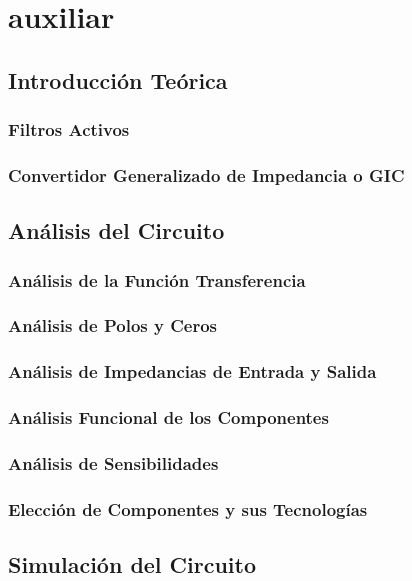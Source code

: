 \documentclass[a4paper]{article}
\begin{document}
\tableofcontents

\section{auxiliar}

\subsection{Introducción Teórica}
\subsubsection{Filtros Activos}
\subsubsection{Convertidor Generalizado de Impedancia o GIC}

\subsection{Análisis del Circuito}
\subsubsection{Análisis de la Función Transferencia}
\subsubsection{Análisis de Polos y Ceros}
\subsubsection{Análisis de Impedancias de Entrada y Salida}
\subsubsection{Análisis Funcional de los Componentes}
\subsubsection{Análisis de Sensibilidades}
\subsubsection{Elección de Componentes y sus Tecnologías}

\subsection{Simulación del Circuito}
\end{document}
